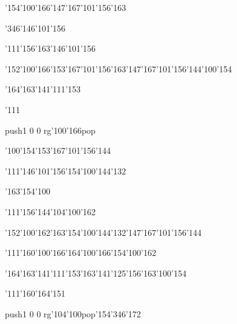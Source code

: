 \null\vfill\ipa\centerline{\enskip\enskip\enskip\enskip\char'154\char'100\char'166\enskip\char'147\char'167\char'101\char'156\char'163}\medskip\centerline{\enskip\char'346\enskip\char'146\char'101\char'156\enskip\enskip\enskip\enskip\enskip\enskip\enskip\enskip}\medskip\centerline{\enskip\enskip\enskip\enskip\enskip\enskip\enskip\enskip\enskip\enskip\enskip\enskip}\medskip\centerline{\enskip\enskip\enskip\enskip\char'111\char'156\char'163\enskip\enskip\enskip\enskip\char'146\char'101\char'156}\medskip\centerline{\enskip\char'152\char'100\char'166\enskip\char'153\char'167\char'101\char'156\char'163\enskip\char'147\char'167\char'101\char'156\char'144\enskip\char'100\char'154}\medskip\centerline{\enskip\enskip\enskip\enskip\enskip\enskip\enskip\enskip\enskip\enskip\enskip\enskip\enskip\enskip\enskip\enskip\enskip}\medskip\centerline{\enskip\char'164\char'163\char'141\char'111\char'153\enskip\enskip\enskip\enskip\enskip\enskip\enskip\enskip\enskip\enskip\enskip\enskip}\medskip\centerline{\enskip\char'111\enskip\enskip\enskip\enskip\enskip\enskip\enskip\enskip\enskip\enskip}\medskip\centerline{\enskip\pdfcolorstack\match push{1 0 0 rg}\char'100\char'166\pdfcolorstack\match pop{}\enskip\enskip\enskip\enskip\enskip\enskip\enskip\enskip\enskip\enskip\enskip\enskip}\medskip\vfill\footline{\hfil\tt\folio\hfil}\eject
\null\vfill\ipa\centerline{\enskip\char'100\char'154\enskip\enskip\enskip\enskip\enskip\char'153\char'167\char'101\char'156\char'144}\medskip\centerline{\enskip\char'111\enskip\char'146\char'101\char'156\enskip\char'154\char'100\char'144\char'132\enskip\enskip\enskip}\medskip\centerline{\enskip\enskip\enskip\char'163\char'154\char'100\enskip\enskip\enskip\enskip\enskip\enskip}\medskip\centerline{\enskip\enskip\enskip\enskip\char'111\char'156\char'144\enskip\enskip\enskip\enskip\char'104\char'100\char'162}\medskip\centerline{\enskip\char'152\char'100\char'162\enskip\char'163\char'154\char'100\char'144\char'132\enskip\char'147\char'167\char'101\char'156\char'144\enskip\enskip\enskip}\medskip\centerline{\enskip\char'111\enskip\char'160\char'100\char'166\enskip\char'164\char'100\char'166\enskip\char'154\char'100\char'162\enskip\enskip\enskip}\medskip\centerline{\enskip\char'164\char'163\char'141\char'111\char'153\enskip\enskip\enskip\enskip\char'163\char'141\char'125\char'156\char'163\enskip\char'100\char'154}\medskip\centerline{\enskip\char'111\enskip\char'160\char'164\char'151\enskip\enskip\enskip\enskip\enskip\enskip}\medskip\centerline{\enskip\enskip\enskip\enskip\pdfcolorstack\match push{1 0 0 rg}\char'104\char'100\pdfcolorstack\match pop{}\enskip\char'154\char'346\char'172\enskip\enskip\enskip\enskip\enskip}\medskip\vfill\footline{\hfil\tt\folio\hfil}\eject
